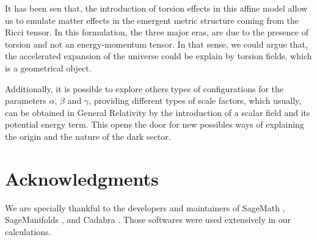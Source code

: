 \documentclass{article}
\begin{document}
It has been sen that, the introduction of torsion effects in this affine model allow us to emulate matter
effects in the emergent metric structure coming from the Ricci tensor. In this formulation, the three major 
eras, are  due to the presence of torsion and not an energy-momentum tensor. In that sense, we could 
argue that, the accelerated expansion of the universe could be explain by torsion fields, which is a 
geometrical object.

Additionally, it is possible to explore others types of configurations for the parameters
$\alpha$, $\beta$ and $\gamma$, providing different types of scale factors, which usually, can be obtained
in General Relativity by the introduction of a scalar field and its potential energy term. This opens 
the door for new possibles ways of explaining the origin and the nature of the dark sector.


\section{Acknowledgments}

We are specially thankful to the developers and maintainers of SageMath \cite{sagemath}, SageManifolds 
\cite{Gourgoulhon_2015,Gourgoulhon_2018}, and Cadabra \cite{peeters2018introducing,Peeters2018,Peeters_2007}. Those softwares were 
used extensively in our calculations.



\end{document}
